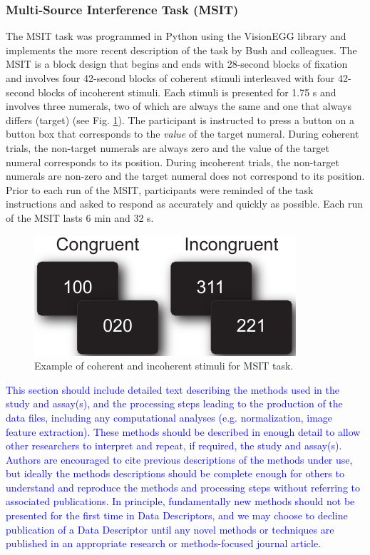 \documentclass[english,11pt]{article}
\begin{document}
\subsubsection*{Multi-Source Interference Task (MSIT)}

The MSIT task was programmed in Python using the VisionEGG library\cite{needed} and implements the more recent description of the task by Bush and colleagues\cite{needed}. The MSIT is a block design that begins and ends with 28-second blocks of fixation and involves four 42-second blocks of coherent stimuli interleaved with four 42-second blocks of incoherent stimuli. Each stimuli is presented for 1.75 \si{\second} and involves three numerals, two of which are always the same and one that always differs (target) (see Fig. \ref{fig:msit_stim}). The participant is instructed to press a button on a button box that corresponds to the \emph{value} of the target numeral. During coherent trials, the non-target numerals are always zero and the value of the target numeral corresponds to its position. During incoherent trials, the non-target numerals are non-zero and the target numeral does not correspond to its position. Prior to each run of the MSIT, participants were reminded of the task instructions and asked to respond as accurately and quickly as possible. Each run of the MSIT lasts 6 \si{\minute} and 32 \si{\second}.

\begin{figure}[!ht]
    \centering
    \includegraphics[]{msit_stim2}
    \caption{Example of coherent and incoherent stimuli for MSIT task.}
    \label{fig:msit_stim}
\end{figure}

\textcolor{blue}{This section should include detailed text describing the methods used
in the study and assay(s), and the processing steps leading to the
production of the data files, including any computational analyses
(e.g. normalization, image feature extraction). These methods should
be described in enough detail to allow other researchers to interpret
and repeat, if required, the study and assay(s). Authors are encouraged
to cite previous descriptions of the methods under use, but ideally
the methods descriptions should be complete enough for others to understand
and reproduce the methods and processing steps without referring to
associated publications. In principle, fundamentally new methods should
not be presented for the first time in Data Descriptors, and we may
choose to decline publication of a Data Descriptor until any novel
methods or techniques are published in an appropriate research or
methods-focused journal article.}
\end{document}
